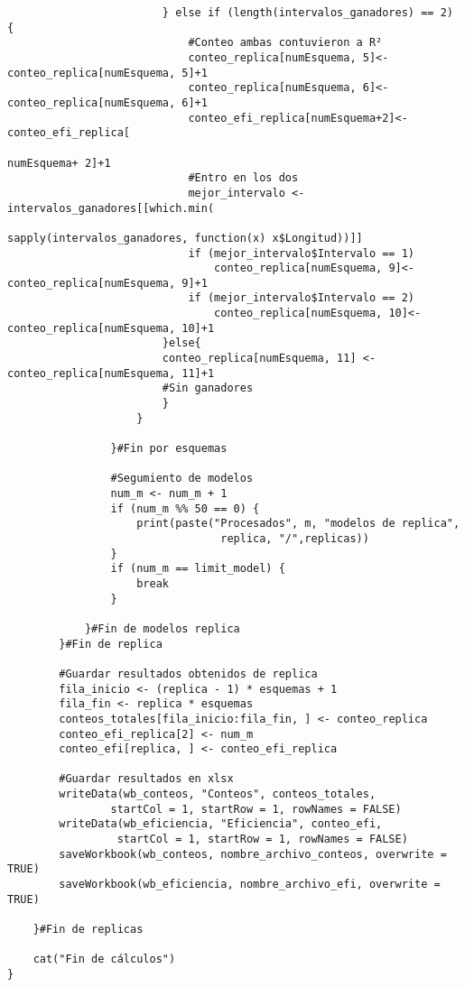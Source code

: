 \begin{verbatim}
						} else if (length(intervalos_ganadores) == 2) {
							#Conteo ambas contuvieron a R²
							conteo_replica[numEsquema, 5]<-conteo_replica[numEsquema, 5]+1
							conteo_replica[numEsquema, 6]<-conteo_replica[numEsquema, 6]+1
							conteo_efi_replica[numEsquema+2]<-conteo_efi_replica[
																			numEsquema+ 2]+1 
							#Entro en los dos
							mejor_intervalo <- intervalos_ganadores[[which.min(
												sapply(intervalos_ganadores, function(x) x$Longitud))]]
							if (mejor_intervalo$Intervalo == 1) 
								conteo_replica[numEsquema, 9]<-conteo_replica[numEsquema, 9]+1
							if (mejor_intervalo$Intervalo == 2) 
								conteo_replica[numEsquema, 10]<-conteo_replica[numEsquema, 10]+1
						}else{
						conteo_replica[numEsquema, 11] <- conteo_replica[numEsquema, 11]+1 
						#Sin ganadores
						}
					}
					
				}#Fin por esquemas
				
				#Segumiento de modelos
				num_m <- num_m + 1
				if (num_m %% 50 == 0) {
					print(paste("Procesados", m, "modelos de replica",
								 replica, "/",replicas))
				}
				if (num_m == limit_model) {
					break
				}
				
			}#Fin de modelos replica
		}#Fin de replica
		
		#Guardar resultados obtenidos de replica
		fila_inicio <- (replica - 1) * esquemas + 1
		fila_fin <- replica * esquemas
		conteos_totales[fila_inicio:fila_fin, ] <- conteo_replica
		conteo_efi_replica[2] <- num_m
		conteo_efi[replica, ] <- conteo_efi_replica
		
		#Guardar resultados en xlsx
		writeData(wb_conteos, "Conteos", conteos_totales, 
				startCol = 1, startRow = 1, rowNames = FALSE)
		writeData(wb_eficiencia, "Eficiencia", conteo_efi,
				 startCol = 1, startRow = 1, rowNames = FALSE)
		saveWorkbook(wb_conteos, nombre_archivo_conteos, overwrite = TRUE)
		saveWorkbook(wb_eficiencia, nombre_archivo_efi, overwrite = TRUE)
		
	}#Fin de replicas
	
	cat("Fin de cálculos")
}
\end{verbatim}


